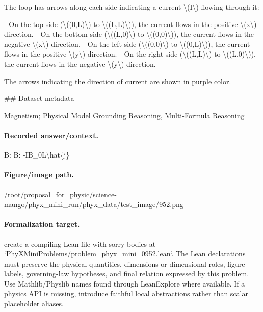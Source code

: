 The loop has arrows along each side indicating a current \textbackslash{}(I\textbackslash{}) flowing through it:

- On the top side (\textbackslash{}((0,L)\textbackslash{}) to \textbackslash{}((L,L)\textbackslash{})), the current flows in the positive \textbackslash{}(x\textbackslash{})-direction.
- On the bottom side (\textbackslash{}((L,0)\textbackslash{}) to \textbackslash{}((0,0)\textbackslash{})), the current flows in the negative \textbackslash{}(x\textbackslash{})-direction.
- On the left side (\textbackslash{}((0,0)\textbackslash{}) to \textbackslash{}((0,L)\textbackslash{})), the current flows in the positive \textbackslash{}(y\textbackslash{})-direction.
- On the right side (\textbackslash{}((L,L)\textbackslash{}) to \textbackslash{}((L,0)\textbackslash{})), the current flows in the negative \textbackslash{}(y\textbackslash{})-direction.

The arrows indicating the direction of current are shown in purple color.

\#\# Dataset metadata

Magnetism; Physical Model Grounding Reasoning, Multi-Formula Reasoning

\paragraph{Recorded answer/context.}
B: B: -IB\_0L\textbackslash{}hat\{j\}

\paragraph{Figure/image path.}
/root/proposal\_for\_physic/science-mango/phyx\_mini\_run/phyx\_data/test\_image/952.png

\paragraph{Formalization target.}
create a compiling Lean file with sorry bodies at `PhyXMiniProblems/problem\_phyx\_mini\_0952.lean`. The Lean declarations must preserve the physical quantities, dimensions or dimensional roles, figure labels, governing-law hypotheses, and final relation expressed by this problem.
Use Mathlib/Physlib names found through LeanExplore where available. If a physics API is missing, introduce faithful local abstractions rather than scalar placeholder aliases.

